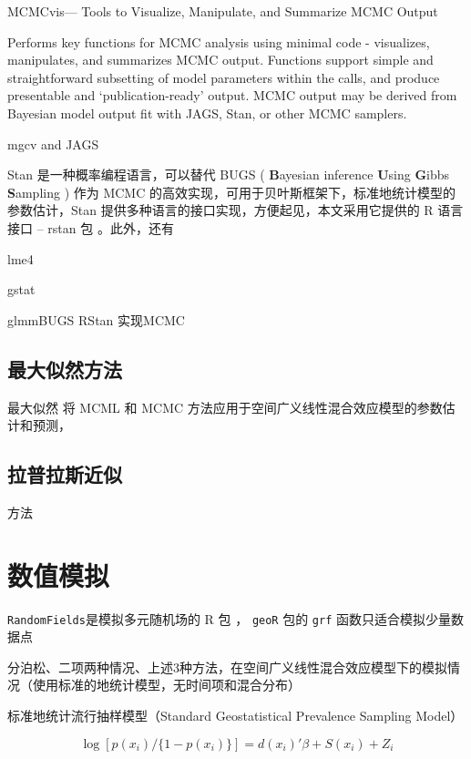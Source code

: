 \documentclass[]{article}
\begin{document}
MCMCvis--- Tools to Visualize, Manipulate, and Summarize MCMC Output

Performs key functions for MCMC analysis using minimal code -
visualizes, manipulates, and summarizes MCMC output. Functions support
simple and straightforward subsetting of model parameters within the
calls, and produce presentable and `publication-ready' output. MCMC
output may be derived from Bayesian model output fit with JAGS, Stan, or
other MCMC samplers.

mgcv and JAGS

Stan 是一种概率编程语言\citep{Stan2017JSS}，可以替代 BUGS (
\textbf{B}ayesian inference \textbf{U}sing \textbf{G}ibbs
\textbf{S}ampling ) \citep{BUGS} 作为 MCMC
的高效实现，可用于贝叶斯框架下，标准地统计模型的参数估计，Stan
提供多种语言的接口实现，方便起见，本文采用它提供的 R 语言接口 -- rstan
包 \citep{Stan2015, Stan2017JSS}。此外，还有\citep{rethinking2015} 　

lme4 \citep{lme4JSS}

gstat \citep{gstat2016}

glmmBUGS RStan 实现MCMC

\subsection{最大似然方法}

最大似然 \citep{PrevMap2017} 将 MCML 和 MCMC
方法应用于空间广义线性混合效应模型的参数估计和预测，

\subsection{拉普拉斯近似}

方法 \citep{Rue2017arXiv}

\section{数值模拟}

\texttt{RandomFields}是模拟多元随机场的 R 包 \citep{RandomFields2015}，
\texttt{geoR} 包\citep{R-geoR2016}的 \texttt{grf}
函数只适合模拟少量数据点

分泊松、二项两种情况、上述3种方法，在空间广义线性混合效应模型下的模拟情况（使用标准的地统计模型，无时间项和混合分布）

标准地统计流行抽样模型（Standard Geostatistical Prevalence Sampling
Model）

\begin{equation}
\log[p(x_i)/\{1-p(x_i)\}] = d(x_i)'\beta + S(x_i) + Z_i \label{eq:SGPSM}
\end{equation}
\end{document}
